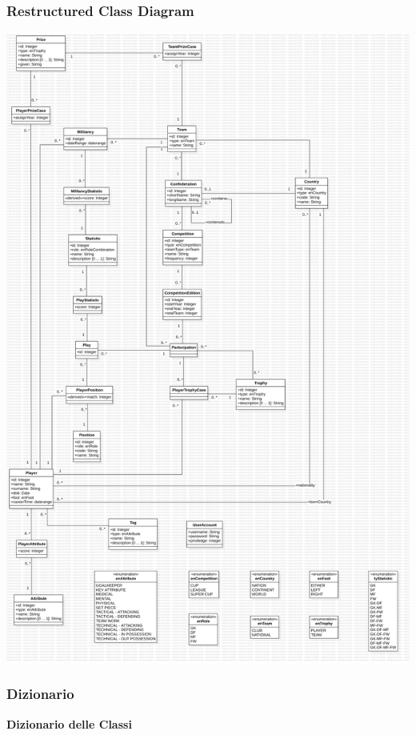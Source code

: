 \subsubsection{Restructured Class Diagram}
\includegraphics[scale= 0.242]{res/class_diagram_ristr}
\newpage

\subsubsection{Dizionario}

\begin{center}
	\textbf{Dizionario delle Classi}
\end{center}


